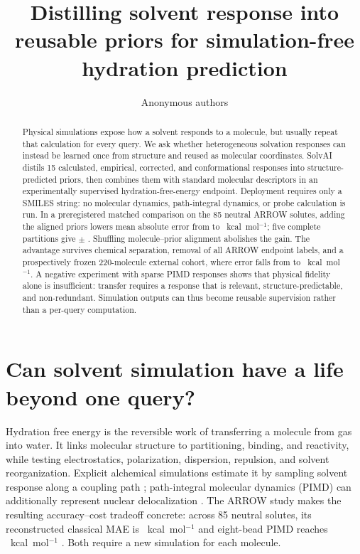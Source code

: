 \documentclass{article}
\title{Distilling solvent response into reusable priors for simulation-free hydration prediction}
\author{Anonymous authors}
\begin{document}
\maketitle

\begin{abstract}
Physical simulations expose how a solvent responds to a molecule, but usually repeat
that calculation for every query. We ask whether heterogeneous solvation responses
can instead be learned once from structure and reused as molecular coordinates.
SolvAI distils 15 calculated, empirical, corrected, and conformational responses into
structure-predicted priors, then combines them with standard molecular descriptors in
an experimentally supervised hydration-free-energy endpoint. Deployment requires
only a SMILES string: no molecular dynamics, path-integral dynamics, or probe
calculation is run. In a preregistered matched comparison on the 85 neutral ARROW
solutes, adding the aligned priors lowers mean absolute error from \MatchedMAE{} to
\SolvAIMAE{}~kcal~mol$^{-1}$; five complete partitions give \RepeatMean{} $\pm$
\RepeatSD{}. Shuffling molecule--prior alignment abolishes the gain. The advantage
survives chemical separation, removal of all ARROW endpoint labels, and a
prospectively frozen 220-molecule external cohort, where error falls from
\TierAStructureMAE{} to \TierASolvAIMAE{}~kcal~mol$^{-1}$. A negative experiment
with sparse PIMD responses shows that physical fidelity alone is insufficient:
transfer requires a response that is relevant, structure-predictable, and
non-redundant. Simulation outputs can thus become reusable supervision rather than a
per-query computation.
\end{abstract}

\section{Can solvent simulation have a life beyond one query?}

Hydration free energy is the reversible work of transferring a molecule from gas into
water. It links molecular structure to partitioning, binding, and reactivity, while
testing electrostatics, polarization, dispersion, repulsion, and solvent
reorganization. Explicit alchemical simulations estimate it by sampling solvent
response along a coupling path \citep{mbar2008}; path-integral molecular dynamics
(PIMD) can additionally represent nuclear delocalization \citep{nqereview2018}. The
ARROW study makes the resulting accuracy--cost tradeoff concrete: across 85 neutral
solutes, its reconstructed classical MAE is \ClassicalMAE{}~kcal~mol$^{-1}$ and
eight-bead PIMD reaches \PIMDMAE{}~kcal~mol$^{-1}$ \citep{arrow2022}. Both require a
new simulation for each molecule.
\end{document}
